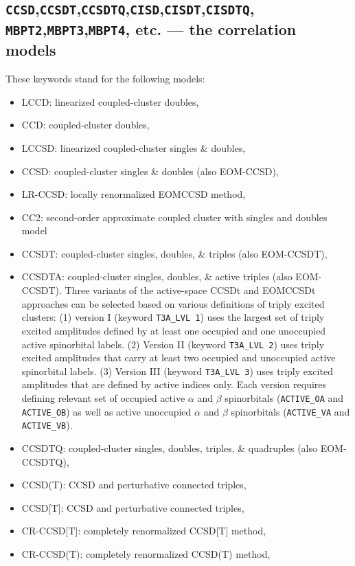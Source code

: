 \subsection{{\tt CCSD},{\tt CCSDT},{\tt CCSDTQ},{\tt CISD},{\tt CISDT},{\tt CISDTQ},
{\tt MBPT2},{\tt MBPT3},{\tt MBPT4}, etc.
 --- the correlation models}

These keywords stand for the following models:
\begin{itemize}
\item LCCD: linearized coupled-cluster doubles,
\item CCD: coupled-cluster doubles,
\item LCCSD: linearized coupled-cluster singles \& doubles,
\item CCSD: coupled-cluster singles \& doubles (also EOM-CCSD),
\item LR-CCSD: locally renormalized EOMCCSD method,  
\item CC2: second-order approximate coupled cluster with singles and doubles model
\item CCSDT: coupled-cluster singles, doubles, \& triples (also EOM-CCSDT),
\item CCSDTA: coupled-cluster singles, doubles, \& active triples (also EOM-CCSDT).
Three variants of the active-space CCSDt and EOMCCSDt approaches can be selected based on 
various definitions of triply excited clusters: (1) version I (keyword {\tt T3A\_LVL  1}) uses
the largest set of triply excited amplitudes defined by at least one occupied and one unoccupied 
active spinorbital labels. (2) Version II (keyword {\tt T3A\_LVL  2}) uses
triply excited amplitudes that carry at least two occupied and unoccupied
active spinorbital labels. (3) Version III (keyword {\tt T3A\_LVL  3}) uses
triply excited amplitudes that are defined by active indices only.
Each version requires defining relevant set of occupied active $\alpha$ and $\beta$ spinorbitals
({\tt ACTIVE\_OA} and {\tt ACTIVE\_OB}) as well as active unoccupied $\alpha$ and $\beta$ spinorbitals
({\tt ACTIVE\_VA} and {\tt ACTIVE\_VB}).
\item CCSDTQ: coupled-cluster singles, doubles, triples, \& quadruples (also EOM-CCSDTQ),
\item CCSD(T): CCSD and perturbative connected triples,
\item CCSD[T]: CCSD and perturbative connected triples,
\item CR-CCSD[T]: completely renormalized CCSD[T] method,
\item CR-CCSD(T): completely renormalized CCSD(T) method,

\end{itemize}

